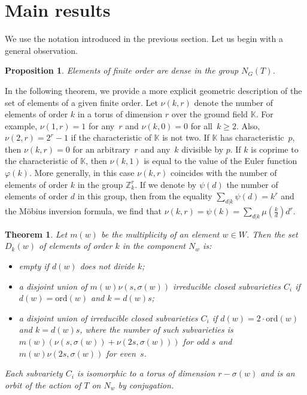 \documentclass[a4paper,12pt]{amsart}
\theoremstyle{plain}
\newtheorem{theorem}{Theorem}
\newtheorem{proposition}{Proposition}
\theoremstyle{definition}
\newcommand{\KK}{\mathbb{K}}
\newcommand{\ord}{\mathrm{ord}}
\begin{document}

\section{Main results}

We use the notation introduced in the previous section. Let us begin with a general observation.

\begin{proposition} \label{fod}
Elements of finite order are dense in the group $N_G(T)$.
\end{proposition}

In the following theorem, we provide a more explicit geometric description of the set of elements of a given finite order. Let $\nu(k,r)$ denote the number of elements of order $k$ in a torus of dimension $r$ over the ground field $\KK$. For example, $\nu(1,r)=1$ for any~$r$ and $\nu(k,0)=0$ for all~$k\ge 2$. Also, $\nu(2,r)=2^r-1$ if the characteristic of $\KK$ is not two. If $\KK$ has characteristic~$p$, then $\nu(k,r)=0$ for an arbitrary~$r$ and any~$k$ divisible by $p$. If $k$ is coprime to the characteristic of $\KK$, then $\nu(k,1)$ is equal to the value of the Euler function $\varphi(k)$. More generally, in this case $\nu(k,r)$ coincides with the number of elements of order $k$ in the group $\mathbb{Z}_k^r$. If we denote by $\psi(d)$ the number of elements of order $d$ in this group, then from the equality $\sum\limits_{d|k}\psi(d)=k^r$ and the M\"obius inversion formula, we find that
$\nu(k,r)=\psi(k)=\sum\limits_{d|k}\mu(\frac{k}{d})d^r$.

\begin{theorem} \label{tmain}
Let $m(w)$ be the multiplicity of an element $w\in W$. Then the set $D_k(w)$ of elements of order $k$ in the component $N_w$ is:
\begin{itemize}
\item[a)]
empty if $d(w)$ does not divide $k$;
\item[b)]
a disjoint union of $m(w)\nu(s,\sigma(w))$ irreducible closed subvarieties $C_i$ if $d(w)=\ord(w)$ and $k=d(w)s$;
\item[c)]
a disjoint union of irreducible closed subvarieties $C_i$ if $d(w)=2\cdot\ord(w)$ and $k=d(w)s$, where the number of such subvarieties is
$m(w)(\nu(s,\sigma(w))+\nu(2s,\sigma(w)))$ for odd $s$ and $m(w)\nu(2s,\sigma(w))$ for even~$s$.
\end{itemize}
Each subvariety $C_i$ is isomorphic to a torus of dimension $r-\sigma(w)$ and is an orbit of the action of $T$ on $N_w$ by conjugation.
\end{theorem}
\end{document}
